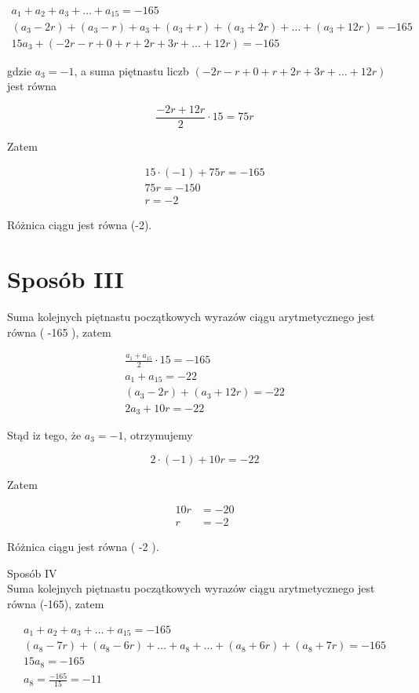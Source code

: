 \documentclass[10pt]{article}
\begin{document}
$$
\begin{gathered}
a_{1}+a_{2}+a_{3}+\ldots+a_{15}=-165 \\
\left(a_{3}-2 r\right)+\left(a_{3}-r\right)+a_{3}+\left(a_{3}+r\right)+\left(a_{3}+2 r\right)+\ldots+\left(a_{3}+12 r\right)=-165 \\
15 a_{3}+(-2 r-r+0+r+2 r+3 r+\ldots+12 r)=-165
\end{gathered}
$$

gdzie $a_{3}=-1$, a suma piętnastu liczb $(-2 r-r+0+r+2 r+3 r+\ldots+12 r)$ jest równa

$$
\frac{-2 r+12 r}{2} \cdot 15=75 r
$$

Zatem

$$
\begin{gathered}
15 \cdot(-1)+75 r=-165 \\
75 r=-150 \\
r=-2
\end{gathered}
$$

Różnica ciągu jest równa (-2).

\section*{Sposób III}
Suma kolejnych piętnastu początkowych wyrazów ciągu arytmetycznego jest równa ( -165 ), zatem

$$
\begin{gathered}
\frac{a_{1}+a_{15}}{2} \cdot 15=-165 \\
a_{1}+a_{15}=-22 \\
\left(a_{3}-2 r\right)+\left(a_{3}+12 r\right)=-22 \\
2 a_{3}+10 r=-22
\end{gathered}
$$

Stąd iz tego, że $a_{3}=-1$, otrzymujemy

$$
2 \cdot(-1)+10 r=-22
$$

Zatem

$$
\begin{aligned}
10 r & =-20 \\
r & =-2
\end{aligned}
$$

Różnica ciągu jest równa ( -2 ).

Sposób IV\\
Suma kolejnych piętnastu początkowych wyrazów ciągu arytmetycznego jest równa (-165), zatem

$$
\begin{gathered}
a_{1}+a_{2}+a_{3}+\ldots+a_{15}=-165 \\
\left(a_{8}-7 r\right)+\left(a_{8}-6 r\right)+\ldots+a_{8}+\ldots+\left(a_{8}+6 r\right)+\left(a_{8}+7 r\right)=-165 \\
15 a_{8}=-165 \\
a_{8}=\frac{-165}{15}=-11
\end{gathered}
$$
\end{document}
